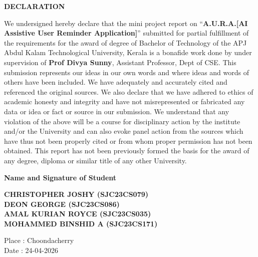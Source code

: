 \newpage
\thispagestyle{empty}
\begin{center}
 {\Large\textbf{DECLARATION}}    
\end{center}
We undersigned hereby declare that the mini project report on ``\textbf{A.U.R.A.[AI Assistive User Reminder Application]}'' submitted for partial fulfillment of the requirements for the award of degree of Bachelor of Technology of the APJ Abdul Kalam Technological University, Kerala is a bonafide work done by under supervision of \textbf{Prof Divya Sunny}, Assistant Professor, Dept of CSE. This submission represents our ideas in our own words and where ideas and words of others have been included. We have adequately and accurately cited and referenced the original sources. We also declare that we have adhered to ethics of academic honesty and integrity and have not misrepresented or fabricated any data or idea or fact or source in our submission. We understand that any violation of the above will be a course for disciplinary action by the institute and/or the University and can also evoke panel action from the sources which have thus not been properly cited or from whom proper permission has not been obtained. This report has not been previously formed the basis for the award of any degree, diploma or similar title of any other University.

\vspace{1cm}

\textbf{Name and Signature of Student}

\vspace{0.3cm}
\begin{flushleft}
\textbf{CHRISTOPHER JOSHY (SJC23CS079)}\\
\textbf{DEON GEORGE (SJC23CS086)}\\
\textbf{AMAL KURIAN ROYCE (SJC23CS035)}\\
\textbf{MOHAMMED BINSHID A (SJC23CS171)}
\end{flushleft}

\vspace{1cm}

\begin{flushleft}
Place : Choondacherry \\
Date  : 24-04-2026
\end{flushleft}

